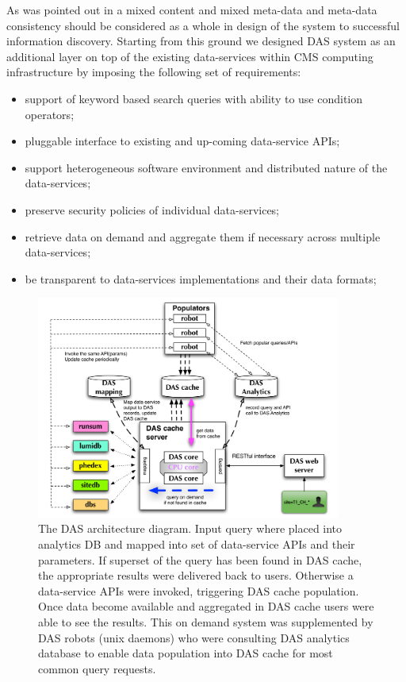 \documentclass[1p,times]{elsarticle}
\begin{document}
As was pointed out in \cite{Arms} a mixed content and 
mixed meta-data and meta-data consistency should be considered as a whole in design 
of the system to successful information discovery. 
Starting from this ground we designed DAS system as an
additional layer on top of the existing data-services
within CMS computing infrastructure by imposing the following set of requirements:
\begin{itemize}
\item support of keyword based search queries with ability to use condition operators;
\item pluggable interface to existing and up-coming data-service APIs;
\item support heterogeneous software environment and distributed nature of the data-services;
\item preserve security policies of individual data-services;
\item retrieve data on demand and aggregate them if necessary across
multiple data-services;
\item be transparent to data-services implementations and their data formats;
\end{itemize}
\begin{figure}[htb]
\centering
\includegraphics[width=100mm]{DAS_Cache_and_Analytics.pdf}
\caption{
The DAS architecture diagram. 
Input query where placed into analytics DB and mapped into set of
data-service APIs and their parameters. If superset of the query has been
found in DAS cache, the appropriate results were delivered back to users.
Otherwise a data-service APIs were invoked, triggering DAS cache population. 
Once data become available and aggregated in DAS cache users were able 
to see the results. This on demand system was supplemented by DAS robots 
(unix daemons) who were consulting DAS analytics database to enable data 
population into DAS cache for most common query requests.
}
\label{DAS_cache}
\end{figure}
\end{document}

